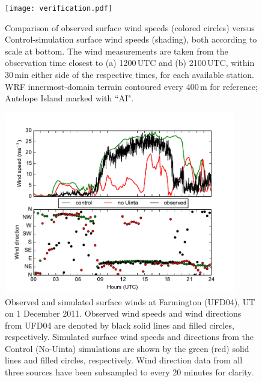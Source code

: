 \documentclass[pdftex,12pt]{article}
\begin{document}
\begin{figure}[t]
\centering
\texttt{[image: verification.pdf]}
\caption{Comparison of observed surface wind speeds (colored circles) versus Control-simulation surface wind speeds (shading), both according to scale at bottom. The wind measurements are taken from the observation time closest to (a) 1200\,UTC and (b) 2100\,UTC, within 30\,min either side of the respective times, for each available station. WRF innermost-domain terrain contoured every 400\,m for reference; Antelope Island marked with ``AI".}
\label{fig:verif}
\end{figure}

\begin{figure}[p]
\centering
\includegraphics[width=0.9\textwidth]{GloversLane_ts}
\caption{Observed and simulated surface winds at Farmington (UFD04), UT on 1 December 2011. Observed wind speeds and wind directions from UFD04 are denoted by black solid lines and filled circles, respectively. Simulated surface wind speeds and directions from the Control (No-Uinta) simulations are shown by the green (red) solid lines and filled circles, respectively. Wind direction data from all three sources have been subsampled to every 20 minutes for clarity.}
\label{fig:glove_ts}
\end{figure}
\end{document}
